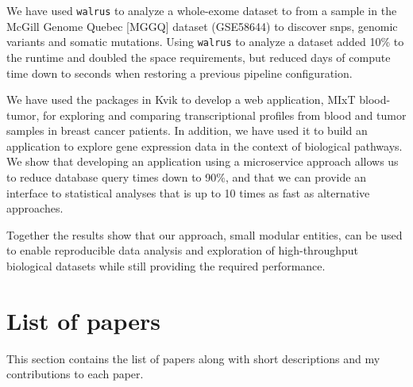 We have used \texttt{walrus} to analyze a whole-exome dataset to from a sample
in the McGill Genome Quebec [MGGQ] dataset (GSE58644)\cite{tofigh2014prognostic}
to discover \glspl{snp}, genomic variants and somatic mutations. Using
\texttt{walrus} to analyze a dataset added 10\% to the runtime and doubled the
space requirements, but reduced days of compute time down to seconds when
restoring a previous pipeline configuration. 

We have used the packages in Kvik to develop a web application, MIxT
blood-tumor, for exploring and comparing transcriptional profiles from blood and
tumor samples in breast cancer patients.  In addition, we have used it to build
an application to explore gene expression data in the context of biological
pathways. We show that developing an application using a microservice approach
allows us to reduce database query times down to 90\%, and that we can provide
an interface to statistical analyses that is up to 10 times as fast as
alternative approaches. 

Together the results show that our approach, small modular entities, can be used
to enable reproducible data analysis and exploration of high-throughput
biological datasets while still providing the required performance. 

\section{List of papers} 
This section contains the list of papers along with short descriptions and my
contributions to each paper. 


